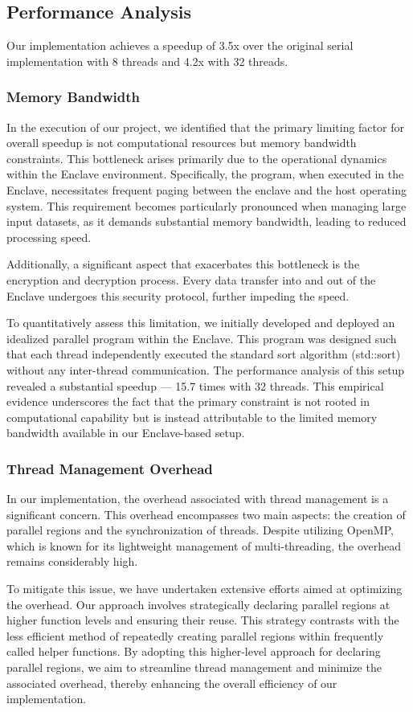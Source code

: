 \documentclass{article}
\begin{document}
\subsection{Performance Analysis}
Our implementation achieves a speedup of 3.5x over the original serial implementation with 8 threads and 4.2x with 32 threads.
\subsubsection{Memory Bandwidth}
In the execution of our project, we identified that the primary limiting factor for overall speedup is not computational resources but memory bandwidth constraints. This bottleneck arises primarily due to the operational dynamics within the Enclave environment. Specifically, the program, when executed in the Enclave, necessitates frequent paging between the enclave and the host operating system. This requirement becomes particularly pronounced when managing large input datasets, as it demands substantial memory bandwidth, leading to reduced processing speed.

Additionally, a significant aspect that exacerbates this bottleneck is the encryption and decryption process. Every data transfer into and out of the Enclave undergoes this security protocol, further impeding the speed.

To quantitatively assess this limitation, we initially developed and deployed an idealized parallel program within the Enclave. This program was designed such that each thread independently executed the standard sort algorithm (std::sort) without any inter-thread communication. The performance analysis of this setup revealed a substantial speedup — 15.7 times with 32 threads. This empirical evidence underscores the fact that the primary constraint is not rooted in computational capability but is instead attributable to the limited memory bandwidth available in our Enclave-based setup.

\subsubsection{Thread Management Overhead}
In our implementation, the overhead associated with thread management is a significant concern. This overhead encompasses two main aspects: the creation of parallel regions and the synchronization of threads. Despite utilizing OpenMP, which is known for its lightweight management of multi-threading, the overhead remains considerably high.

To mitigate this issue, we have undertaken extensive efforts aimed at optimizing the overhead. Our approach involves strategically declaring parallel regions at higher function levels and ensuring their reuse. This strategy contrasts with the less efficient method of repeatedly creating parallel regions within frequently called helper functions. By adopting this higher-level approach for declaring parallel regions, we aim to streamline thread management and minimize the associated overhead, thereby enhancing the overall efficiency of our implementation.
\end{document}
